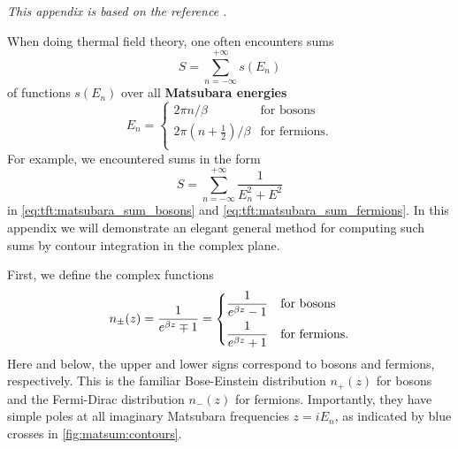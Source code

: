 \textit{This appendix is based on the reference \cite{ref:altland_simons}.}

When doing thermal field theory, one often encounters sums
\begin{equation}
	S = \sum_{n=-\infty}^{+\infty} s(E_n)
\label{eq:matsum:sum}
\end{equation}
of functions $s(E_n)$ over all \textbf{Matsubara energies}
\begin{equation}
	E_n = \begin{cases}
	          2 \pi n / \beta                        & \text{for bosons}    \\
	          2 \pi \left( n+\frac12 \right) / \beta & \text{for fermions} .\\
	      \end{cases}
\end{equation}
For example, we encountered sums in the form
\begin{equation}
	S = \sum_{n=-\infty}^{+\infty} \frac{1}{E_n^2 + E^2}
\label{eq:matsum:motivating_example}
\end{equation}
in \cref{eq:tft:matsubara_sum_bosons} and \cref{eq:tft:matsubara_sum_fermions}.
In this appendix we will demonstrate an elegant general method for computing such sums by contour integration in the complex plane.

First, we define the complex functions
\begin{equation}
	n_\pm(z) = \frac{1}{e^{\beta z} \mp 1}
	         = \begin{dcases}
		           \displaystyle \frac{1}{e^{\beta z} - 1} & \text{for bosons}     \\
		           \displaystyle \frac{1}{e^{\beta z} + 1} & \text{for fermions} . \\
	           \end{dcases}
\label{eq:matsum:distribution}
\end{equation}
Here and below, the upper and lower signs correspond to bosons and fermions, respectively.
This is the familiar Bose-Einstein distribution $n_+(z)$ for bosons and the Fermi-Dirac distribution $n_-(z)$ for fermions.
Importantly, they have simple poles at all imaginary Matsubara frequencies $z = i E_n$, as indicated by blue crosses in \cref{fig:matsum:contours}. 

\usetikzlibrary{decorations.markings}


